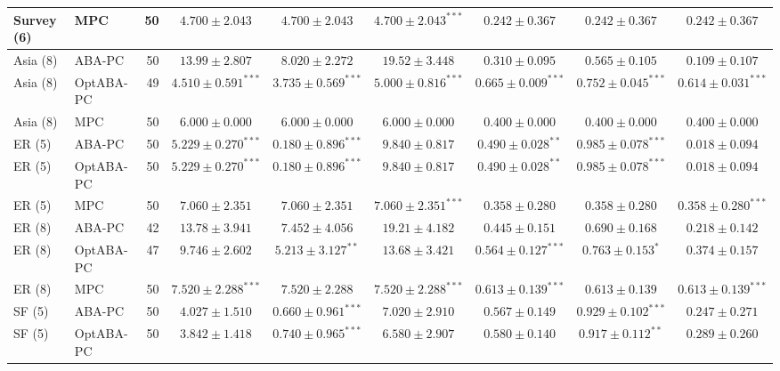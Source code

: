 \begin{table}[t]
{\begin{tabular}{llrcccccc}
Survey (6) & MPC & 50 & $4.700\pm2.043$ & $4.700\pm2.043$ & $\mathbf{4.700\pm2.043}^{\ast\ast\ast}$ & $0.242\pm0.367$ & $0.242\pm0.367$ & $0.242\pm0.367$\\
\midrule
Asia (8) & ABA-PC & 50 & $13.99\pm2.807$ & $8.020\pm2.272$ & $19.52\pm3.448$ & $0.310\pm0.095$ & $0.565\pm0.105$ & $0.109\pm0.107$\\
Asia (8) & OptABA-PC & 49 & $\mathbf{4.510\pm0.591}^{\ast\ast\ast}$ & $\mathbf{3.735\pm0.569}^{\ast\ast\ast}$ & $\mathbf{5.000\pm0.816}^{\ast\ast\ast}$ & $\mathbf{0.665\pm0.009}^{\ast\ast\ast}$ & $\mathbf{0.752\pm0.045}^{\ast\ast\ast}$ & $\mathbf{0.614\pm0.031}^{\ast\ast\ast}$\\
Asia (8) & MPC & 50 & $6.000\pm0.000$ & $6.000\pm0.000$ & $6.000\pm0.000$ & $0.400\pm0.000$ & $0.400\pm0.000$ & $0.400\pm0.000$\\
\midrule
ER (5) & ABA-PC & 50 & $\mathbf{5.229\pm0.270}^{\ast\ast\ast}$ & $\mathbf{0.180\pm0.896}^{\ast\ast\ast}$ & $9.840\pm0.817$ & $\mathbf{0.490\pm0.028}^{\ast\ast}$ & $\mathbf{0.985\pm0.078}^{\ast\ast\ast}$ & $0.018\pm0.094$\\
ER (5) & OptABA-PC & 50 & $\mathbf{5.229\pm0.270}^{\ast\ast\ast}$ & $\mathbf{0.180\pm0.896}^{\ast\ast\ast}$ & $9.840\pm0.817$ & $\mathbf{0.490\pm0.028}^{\ast\ast}$ & $\mathbf{0.985\pm0.078}^{\ast\ast\ast}$ & $0.018\pm0.094$\\
ER (5) & MPC & 50 & $7.060\pm2.351$ & $7.060\pm2.351$ & $\mathbf{7.060\pm2.351}^{\ast\ast\ast}$ & $0.358\pm0.280$ & $0.358\pm0.280$ & $\mathbf{0.358\pm0.280}^{\ast\ast\ast}$\\
\midrule
ER (8) & ABA-PC & 42 & $13.78\pm3.941$ & $7.452\pm4.056$ & $19.21\pm4.182$ & $0.445\pm0.151$ & $0.690\pm0.168$ & $0.218\pm0.142$\\
ER (8) & OptABA-PC & 47 & $9.746\pm2.602$ & $\mathbf{5.213\pm3.127}^{\ast\ast}$ & $13.68\pm3.421$ & $\mathbf{0.564\pm0.127}^{\ast\ast\ast}$ & $\mathbf{0.763\pm0.153}^{\ast}$ & $0.374\pm0.157$\\
ER (8) & MPC & 50 & $\mathbf{7.520\pm2.288}^{\ast\ast\ast}$ & $7.520\pm2.288$ & $\mathbf{7.520\pm2.288}^{\ast\ast\ast}$ & $\mathbf{0.613\pm0.139}^{\ast\ast\ast}$ & $0.613\pm0.139$ & $\mathbf{0.613\pm0.139}^{\ast\ast\ast}$\\
\midrule
SF (5) & ABA-PC & 50 & $4.027\pm1.510$ & $\mathbf{0.660\pm0.961}^{\ast\ast\ast}$ & $7.020\pm2.910$ & $0.567\pm0.149$ & $\mathbf{0.929\pm0.102}^{\ast\ast\ast}$ & $0.247\pm0.271$\\
SF (5) & OptABA-PC & 50 & $3.842\pm1.418$ & $\mathbf{0.740\pm0.965}^{\ast\ast\ast}$ & $6.580\pm2.907$ & $0.580\pm0.140$ & $\mathbf{0.917\pm0.112}^{\ast\ast}$ & $0.289\pm0.260$\\

\end{tabular}}
\end{table}
